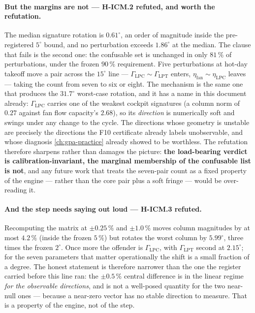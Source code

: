 \paragraph{But the margins are not --- H-ICM.2 refuted, and worth the refutation.} The median
signature rotation is $0.61^{\circ}$, an order of magnitude inside the pre-registered
$5^{\circ}$ bound, and no perturbation exceeds $1.86^{\circ}$ at the median. The clause that
fails is the second one: the confusable set is unchanged in only $81\,\%$ of perturbations,
under the frozen $90\,\%$ requirement. Five perturbations at hot-day takeoff move a pair
across the $15^{\circ}$ line --- $\Gamma_{\mathrm{LPC}}\!\sim\!\Gamma_{\mathrm{LPT}}$ enters,
$\eta_{\mathrm{fan}}\!\sim\!\eta_{\mathrm{LPC}}$ leaves --- taking the count from seven to six
or eight. The mechanism is the same one that produces the $31.7^{\circ}$ worst-case rotation,
and it has a name in this document already: $\Gamma_{\mathrm{LPC}}$ carries one of the
weakest cockpit signatures (a column norm of $0.27$ against fan flow capacity's $2.68$), so
its \emph{direction} is numerically soft and swings under any change to the cycle. The
directions whose geometry is unstable are precisely the directions the F10 certificate
already labels unobservable, and whose diagnosis \cref{ch:gpa-practice} already showed to be
worthless. The refutation therefore sharpens rather than damages the picture: \textbf{the
load-bearing verdict is calibration-invariant, the marginal membership of the confusable list
is not}, and any future work that treats the seven-pair count as a fixed property of the
engine --- rather than the core pair plus a soft fringe --- would be over-reading it.

\paragraph{And the step needs saying out loud --- H-ICM.3 refuted.} Recomputing the matrix at
$\pm0.25\,\%$ and $\pm1.0\,\%$ moves column magnitudes by at most $4.2\,\%$ (inside the frozen
$5\,\%$) but rotates the worst column by $5.99^{\circ}$, three times the frozen $2^{\circ}$.
Once more the offender is $\Gamma_{\mathrm{LPC}}$, with $\Gamma_{\mathrm{LPT}}$ second at
$2.15^{\circ}$; for the seven parameters that matter operationally the shift is a small
fraction of a degree. The honest statement is therefore narrower than the one the register
carried before this line ran: the $\pm0.5\,\%$ central difference is in the linear regime
\emph{for the observable directions}, and is not a well-posed quantity for the two near-null
ones --- because a near-zero vector has no stable direction to measure. That is a property of
the engine, not of the step.

